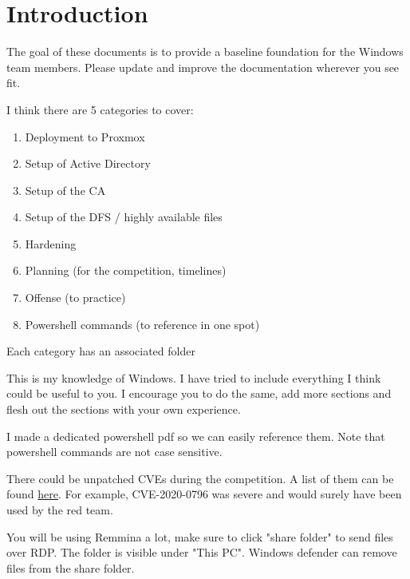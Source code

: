 \documentclass{article}
\begin{document}
\graphicspath{ {./Images/} }
\tableofcontents

\section{Introduction}
The goal of these documents is to provide a baseline foundation for the Windows team members.
Please update and improve the documentation wherever you see fit.

I think there are 5 categories to cover:

\begin{enumerate}
        \item Deployment to Proxmox
        \item Setup of Active Directory
        \item Setup of the CA
        \item Setup of the DFS / highly available files
        \item Hardening
        \item Planning (for the competition, timelines)
        \item Offense (to practice)
        \item Powershell commands (to reference in one spot)
\end{enumerate}

Each category has an associated folder

This is my knowledge of Windows. I have tried to include everything I think could be useful to you.
I encourage you to do the same, add more sections and flesh out the sections with your own experience.

I made a dedicated powershell pdf so we can easily reference them.
Note that powershell commands are not case sensitive.

There could be unpatched CVEs during the competition. A list of them can be found \href{https://stack.watch/product/microsoft/windows-server-2019/}{here}.
For example, CVE-2020-0796 was severe and would surely have been used by the red team.

You will be using Remmina a lot, make sure to click "share folder" to send files over RDP.
The folder is visible under "This PC".
Windows defender can remove files from the share folder.
\end{document}

